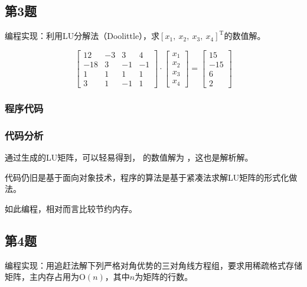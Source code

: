 \documentclass[UTF8, a4paper, zihao=-4, bibliography=totoc]{ctexart}
\begin{document}
\subsection{第3题}

编程实现：利用LU分解法（Doolittle），求$[x_1,\ x_2,\ x_3,\ x_4]^\mathrm{T}$的数值解。

\begin{equation}
\left[ \begin{array}{rrrr}{12} & {-3} & {3} & {4} \\ {-18} & {3} & {-1} & {-1} \\ {1} & {1} & {1} & {1} \\ {3} & {1} & {-1} & {1}\end{array}\right] \cdot \left[ \begin{array}{c}{x_{1}} \\ {x_{2}} \\ {x_{3}} \\ {x_{4}}\end{array}\right]=\left[ \begin{array}{r}{15} \\ {-15} \\ {6} \\ {2}\end{array}\right]
\end{equation}

\subsubsection{程序代码}


\subsubsection{代码分析}

通过生成的LU矩阵，可以轻易得到， 的数值解为 ，这也是解析解。

代码仍旧是基于面向对象技术，程序的算法是基于紧凑法求解LU矩阵的形式化做法。

如此编程，相对而言比较节约内存。

\subsection{第4题}

编程实现：用追赶法解下列严格对角优势的三对角线方程组，要求用稀疏格式存储矩阵，主内存占用为$\mathrm{O}(n)$，其中$n$为矩阵的行数。
\end{document}
